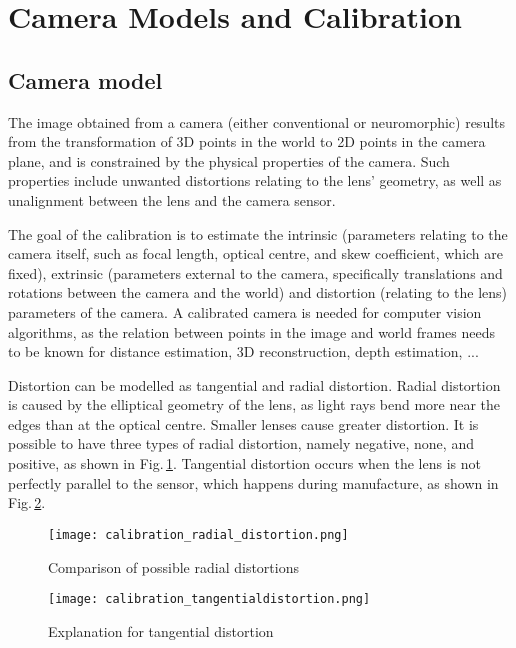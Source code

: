 \section{Camera Models and Calibration}
\label{sec:sec2_camera_model_calibration}

\subsection{Camera model}
\label{sec:sec2_camera_model}

The image obtained from a camera (either conventional or neuromorphic) results from the transformation of 3D points in the world to 2D points in the camera plane, and is constrained by the physical properties of the camera. Such properties include unwanted distortions relating to the lens' geometry, as well as unalignment between the lens and the camera sensor. 

The goal of the calibration is to estimate the intrinsic (parameters relating to the camera itself, such as focal length, optical centre, and skew coefficient, which are fixed), extrinsic (parameters external to the camera, specifically translations and rotations between the camera and the world) and distortion (relating to the lens) parameters of the camera. A calibrated camera is needed for computer vision algorithms, as the relation between points in the image and world frames needs to be known for distance estimation, 3D reconstruction, depth estimation, ...

Distortion can be modelled as tangential and radial distortion. Radial distortion is caused by the elliptical geometry of the lens, as light rays bend more near the edges than at the optical centre. Smaller lenses cause greater distortion. It is possible to have three types of radial distortion, namely negative, none, and positive, as shown in Fig.\,\ref{fig:sec2_radial_distortion}. Tangential distortion occurs when the lens is not perfectly parallel to the sensor, which happens during manufacture, as shown in Fig.\,\ref{fig:sec2_tangential_distortion}.

\begin{figure}[ht]
    \centering
    \texttt{[image: calibration\_radial\_distortion.png]}
    \caption{Comparison of possible radial distortions}
    \label{fig:sec2_radial_distortion}
\end{figure}

\begin{figure}[ht]
    \centering
    \texttt{[image: calibration\_tangentialdistortion.png]}
    \caption{Explanation for tangential distortion}
    \label{fig:sec2_tangential_distortion}
\end{figure}

